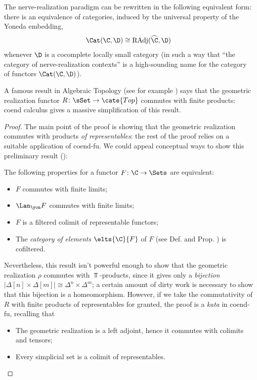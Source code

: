 \begin{remark}
The nerve\hyp{}realization paradigm can be rewritten in the following equivalent form: there is an equivalence of categories, induced by the universal property of the Yoneda embedding, 
\[
\Cat(\C, \D)\cong \text{RAdj}(\widehat{\C}, \D)
\]
whenever $\D$ is a cocomplete locally small category (in such a way that ``the category of nerve\hyp{}realization contexts'' is a high-sounding name for the category of functors $\Cat(\C, \D)$).
\end{remark}
A famous result in Algebraic Topology (see for example \cite{GZ, GoJ}) says that the geometric realization functor $R\colon \sSet\to\cate{Top}$ commutes with finite products: coend calculus gives a massive simplification of this result.
\begin{proof}
The main point of the proof is showing that the geometric realization commutes with products \emph{of representables}: the rest of the proof relies on a suitable application of coend-fu. We could appeal conceptual ways to show this preliminary result (\cite[\S \textbf{2}]{adamek2002classification}):
\begin{proposition}\label{cofiltness}
The following properties for a functor $F\colon \C\to \Sets$ are equivalent:
\begin{itemize}
\item $F$ commutes with finite limits;
\item $\Lan_\yon F$ commutes with finite limits;
\item $F$ is a filtered colimit of representable functors;
\item The \emph{category of elements} $\elts{\C}{F}$ of $F$ (see Def\@.  and Prop\@. ) is cofiltered.
\end{itemize}
\end{proposition}
Nevertheless, this result isn't powerful enough to show that the geometric realization $\rho$ commutes with $\Top$-products, since it gives only a \emph{bijection} $|\Delta[n]\times \Delta[m]|\cong \Delta^n \times \Delta^m$; a certain amount of dirty work is necessary to show that this bijection is a homeomorphism. However, if we take the commutativity of $R$ with finite products of representables for granted, the proof is a \emph{kata} in coend-fu, recalling that
\begin{itemize}
\item The geometric realization is a left adjoint, hence it commutes with colimits and tensors;
\item Every simplicial set is a colimit of representables.

\end{itemize}
\end{proof}
